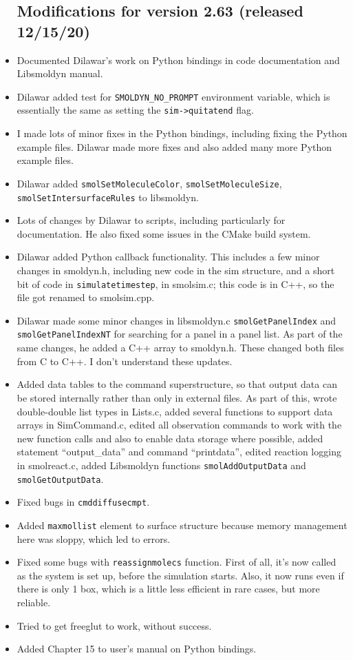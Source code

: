 \documentclass {scrbook}
\newcommand {\ttt} {\texttt}
\begin{document}
\begin{itemize}
\subsection{Modifications for version 2.63 (released 12/15/20)}
\item Documented Dilawar's work on Python bindings in code documentation and Libsmoldyn manual.
\item Dilawar added test for \ttt{SMOLDYN\_NO\_PROMPT} environment variable, which is essentially the same as setting the \ttt{sim->quitatend} flag.
\item I made lots of minor fixes in the Python bindings, including fixing the Python example files. Dilawar made more fixes and also added many more Python example files.
\item Dilawar added \ttt{smolSetMoleculeColor}, \ttt{smolSetMoleculeSize}, \ttt{smolSetIntersurfaceRules} to libsmoldyn.
\item Lots of changes by Dilawar to scripts, including particularly for documentation. He also fixed some issues in the CMake build system.
\item Dilawar added Python callback functionality. This includes a few minor changes in smoldyn.h, including new code in the sim structure, and a short bit of code in \ttt{simulatetimestep}, in smolsim.c; this code is in C++, so the file got renamed to smolsim.cpp.
\item Dilawar made some minor changes in libsmoldyn.c \ttt{smolGetPanelIndex} and \ttt{smolGetPanelIndexNT} for searching for a panel in a panel list. As part of the same changes, he added a C++ array to smoldyn.h. These changed both files from C to C++. I don't understand these updates.
\item Added data tables to the command superstructure, so that output data can be stored internally rather than only in external files. As part of this, wrote double-double list types in Lists.c, added several functions to support data arrays in SimCommand.c, edited all observation commands to work with the new function calls and also to enable data storage where possible, added statement ``output\_data'' and command ``printdata'', edited reaction logging in smolreact.c, added Libsmoldyn functions \ttt{smolAddOutputData} and \ttt{smolGetOutputData}.
\item Fixed bugs in \ttt{cmddiffusecmpt}.
\item Added \ttt{maxmollist} element to surface structure because memory management here was sloppy, which led to errors.
\item Fixed some bugs with \ttt{reassignmolecs} function. First of all, it's now called as the system is set up, before the simulation starts. Also, it now runs even if there is only 1 box, which is a little less efficient in rare cases, but more reliable.
\item Tried to get freeglut to work, without success.
\item Added Chapter 15 to user's manual on Python bindings.


\end{itemize}
\end{document}
